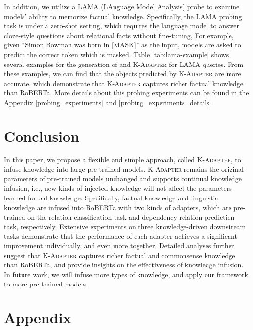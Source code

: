 \documentclass[11pt,a4paper]{article}
\begin{document}
In addition, we utilize a LAMA (LAnguage Model Analysis) probe \citep{petroni2019language} to examine models' ability to memorize factual knowledge. Specifically, the LAMA probing task is under a zero-shot setting, which requires the language model to answer cloze-style questions about relational facts without fine-tuning, For example, given ``Simon Bowman was born in [MASK]'' as the input, models are asked to predict the correct token which is masked. Table \ref{tab:lama-example} shows several examples for the generation of  and \textsc{K-Adapter} for LAMA queries. From these examples, we can find that the objects predicted by \textsc{K-Adapter} are more accurate, which demonstrate that \textsc{K-Adapter} captures richer factual knowledge than RoBERTa. More details about this probing experiments can be found in the Appendix \ref{probing_experiments} and \ref{probing_experiments_details}.

\section{Conclusion}
In this paper, we propose a flexible and simple approach, called \textsc{K-Adapter}, to infuse knowledge into large pre-trained models. \textsc{K-Adapter} remains the original parameters of pre-trained models unchanged and supports continual knowledge infusion, i.e., new kinds of injected-knowledge will not affect the parameters learned for old knowledge. Specifically, factual knowledge and linguistic knowledge are infused into RoBERTa with two kinds of adapters, which are pre-trained on the relation classification task and dependency relation prediction task, respectively. Extensive experiments on three knowledge-driven downstream tasks demonstrate that the performance of each adapter achieves a significant improvement individually, and even more together. Detailed analyses further suggest that \textsc{K-Adapter} captures richer factual and commonsense knowledge than RoBERTa, and provide insights on the effectiveness of knowledge infusion.
In future work, we will infuse more types of knowledge, and apply our framework to more pre-trained models.





\newpage
\appendix
\section*{Appendix}
\label{sec:appendix}
\end{document}
